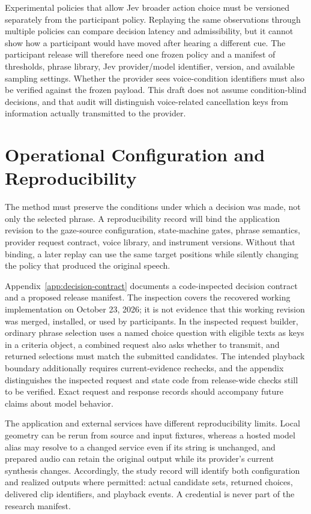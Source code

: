 Experimental policies that allow Jev broader action choice must be versioned separately from the participant policy. Replaying the same observations through multiple policies can compare decision latency and admissibility, but it cannot show how a participant would have moved after hearing a different cue. The participant release will therefore need one frozen policy and a manifest of thresholds, phrase library, Jev provider/model identifier, version, and available sampling settings. Whether the provider sees voice-condition identifiers must also be verified against the frozen payload. This draft does not assume condition-blind decisions, and that audit will distinguish voice-related cancellation keys from information actually transmitted to the provider.


\section{Operational Configuration and Reproducibility}
The method must preserve the conditions under which a decision was made, not only the selected phrase. A reproducibility record will bind the application revision to the gaze-source configuration, state-machine gates, phrase semantics, provider request contract, voice library, and instrument versions. Without that binding, a later replay can use the same target positions while silently changing the policy that produced the original speech.

Appendix~\ref{app:decision-contract} documents a code-inspected decision contract and a proposed release manifest. The inspection covers the recovered working implementation on October 23, 2026; it is not evidence that this working revision was merged, installed, or used by participants. In the inspected request builder, ordinary phrase selection uses a named choice question with eligible texts as keys in a criteria object, a combined request also asks whether to transmit, and returned selections must match the submitted candidates. The intended playback boundary additionally requires current-evidence rechecks, and the appendix distinguishes the inspected request and state code from release-wide checks still to be verified. Exact request and response records should accompany future claims about model behavior.

The application and external services have different reproducibility limits. Local geometry can be rerun from source and input fixtures, whereas a hosted model alias may resolve to a changed service even if its string is unchanged, and prepared audio can retain the original output while its provider's current synthesis changes. Accordingly, the study record will identify both configuration and realized outputs where permitted: actual candidate sets, returned choices, delivered clip identifiers, and playback events. A credential is never part of the research manifest.

